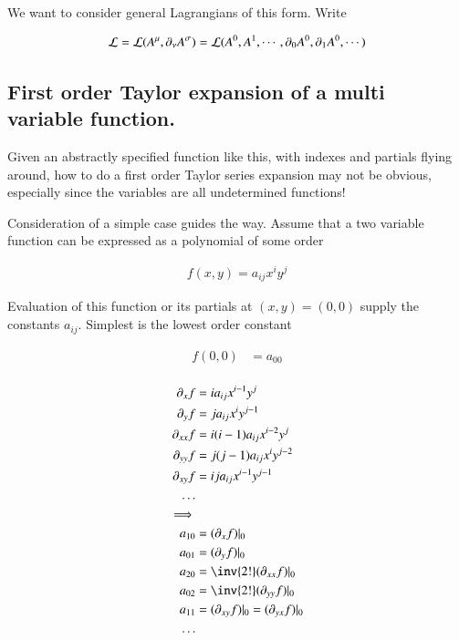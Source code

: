 We want to consider general Lagrangians of this form.  Write

\begin{align}
\mathcal{L} = \mathcal{L}( A^\mu, \partial_\nu A^\sigma) = \mathcal{L}(A^0, A^1, \cdots, \partial_0 A^0, \partial_1 A^0, \cdots )
\end{align}

\subsection{First order Taylor expansion of a multi variable function. }

Given an abstractly specified function like this, with indexes and partials flying around, how to do a first order Taylor series expansion may not be obvious, especially since the variables are all undetermined functions!

Consideration of a simple case guides the way.  Assume that a two variable function can be expressed as a polynomial of some order

\begin{align*}
f(x,y) = a_{i j} x^i y^j
\end{align*}

Evaluation of this function or its partials at $(x,y) = (0,0)$ supply the constants $a_{i j}$.  Simplest is the lowest order constant

\begin{align*}
f(0,0) &= a_{0 0} \\
\end{align*}

\begin{align*}
\partial_x f &= i a_{i j} x^{i-1} y^j \\
\partial_y f &= j a_{i j} x^{i} y^{j-1} \\
\partial_{xx} f &= i(i-1) a_{i j} x^{i-2} y^j \\
\partial_{yy} f &= j(j-1) a_{i j} x^{i} y^{j-2} \\
\partial_{xy} f &= i j a_{i j} x^{i-1} y^{j-1} \\
\hdots \\
\implies \\
a_{1 0} &= (\partial_x f) \vert_0 \\
a_{0 1} &= (\partial_y f) \vert_0 \\
a_{2 0} &= \inv{2!} (\partial_{xx} f) \vert_0 \\
a_{0 2} &= \inv{2!} (\partial_{yy} f) \vert_0 \\
a_{1 1} &= (\partial_{xy} f) \vert_0 = (\partial_{yx} f) \vert_0 \\
\hdots
\end{align*}

